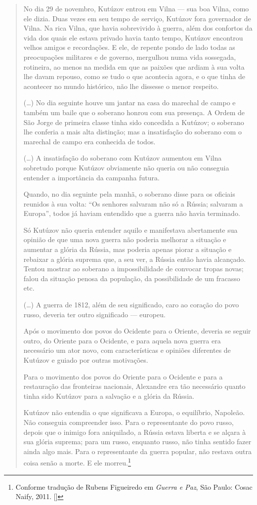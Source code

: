 \begin{quote}
No dia 29 de novembro, Kutúzov entrou em Vilna --- sua boa Vilna, como ele
dizia. Duas vezes em seu tempo de serviço, Kutúzov fora governador de
Vilna. Na rica Vilna, que havia sobrevivido à guerra, além dos confortos
da vida dos quais ele estava privado havia tanto tempo, Kutúzov
encontrou velhos amigos e recordações. E ele, de repente pondo de lado
todas as preocupações militares e de governo, mergulhou numa vida
sossegada, rotineira, ao menos na medida em que as paixões que ardiam à
sua volta lhe davam repouso, como se tudo o que acontecia agora, e o que
tinha de acontecer no mundo histórico, não lhe dissesse o menor
respeito.

(\ldots{}) No dia seguinte houve um jantar na casa do marechal de campo e
também um baile que o soberano honrou com sua presença. A Ordem de São
Jorge de primeira classe tinha sido concedida a Kutúzov; o soberano lhe
conferia a mais alta distinção; mas a insatisfação do soberano com o
marechal de campo era conhecida de todos.

(\ldots{}) A insatisfação do soberano com Kutúzov aumentou em Vilna sobretudo
porque Kutúzov obviamente não queria ou não conseguia entender a
importância da campanha futura.

Quando, no dia seguinte pela manhã, o soberano disse para os oficiais
reunidos à sua volta: ``Os senhores salvaram não só a Rússia; salvaram a
Europa'', todos já haviam entendido que a guerra não havia terminado.

Só Kutúzov não queria entender aquilo e manifestava abertamente sua
opinião de que uma nova guerra não poderia melhorar a situação e
aumentar a glória da Rússia, mas poderia apenas piorar a situação e
rebaixar a glória suprema que, a seu ver, a Rússia então havia
alcançado. Tentou mostrar ao soberano a impossibilidade de convocar
tropas novas; falou da situação penosa da população, da possibilidade de
um fracasso etc.

(\ldots{}) A guerra de 1812, além de seu significado, caro ao coração do povo
russo, deveria ter outro significado --- europeu.

Após o movimento dos povos do Ocidente para o Oriente, deveria se seguir
outro, do Oriente para o Ocidente, e para aquela nova guerra era
necessário um ator novo, com características e opiniões diferentes de
Kutúzov e guiado por outras motivações.

Para o movimento dos povos do Oriente para o Ocidente e para a
restauração das fronteiras nacionais, Alexandre  era tão necessário
quanto tinha sido Kutúzov para a salvação e a glória da Rússia.

Kutúzov não entendia o que significava a Europa, o equilíbrio, Napoleão.
Não conseguia compreender isso. Para o representante do povo russo,
depois que o inimigo fora aniquilado, a Rússia estava liberta e se
alçara à sua glória suprema; para um russo, enquanto russo, não tinha
sentido fazer ainda algo mais. Para o representante da guerra popular,
não restava outra coisa senão a morte. E ele morreu.\footnote{Conforme tradução de Rubens Figueiredo em \textit{Guerra e Paz}, São Paulo: Cosac Naify, 2011. []} 
\end{quote}

